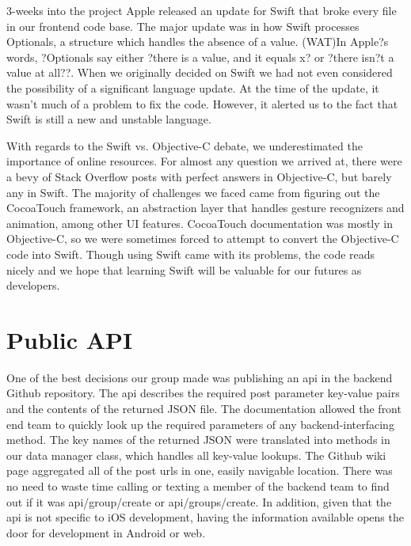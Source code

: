 \documentclass[12pt]{article}
\begin{document}
3-weeks into the project Apple released an update for Swift that broke every file in our frontend code base. 
The major update was in how Swift processes Optionals, a structure which handles the absence of a value. 
(WAT)In Apple?s words, ?Optionals say either ?there is a value, and it equals x? or ?there isn?t a value at all??. 
When we originally decided on Swift we had not even considered the possibility of a significant language update. 
At the time of the update, it wasn't much of a problem to fix the code. 
However, it alerted us to the fact that Swift is still a new and unstable language. 

\bigskip

With regards to the Swift vs. Objective-C debate, we underestimated the importance of online resources. 
For almost any question we arrived at, there were a bevy of Stack Overflow posts with perfect answers in Objective-C, but barely any in Swift. 
The majority of challenges we faced came from figuring out the CocoaTouch framework, an abstraction layer that handles gesture recognizers and animation, among other UI features. 
CocoaTouch documentation was mostly in Objective-C, so we were sometimes forced to attempt to convert the Objective-C code into Swift. 
Though using Swift came with its problems, the code reads nicely and we hope that learning Swift will be valuable for our futures as developers.

\bigskip

\section{Public API}
One of the best decisions our group made was publishing an api in the backend Github repository. The api describes the required post parameter key-value pairs and the contents of the returned JSON file. The documentation allowed the front end team to quickly look up the required parameters of any backend-interfacing method. The key names of the returned JSON were translated into methods in our data manager class, which handles all key-value lookups. The Github wiki page aggregated all of the post urls in one, easily navigable location. There was no need to waste time calling or texting a member of the backend team to find out if it was api/group/create or api/groups/create. In addition, given that the api is not specific to iOS development, having the information available opens the door for development in Android or web.

\bigskip
\end{document}
